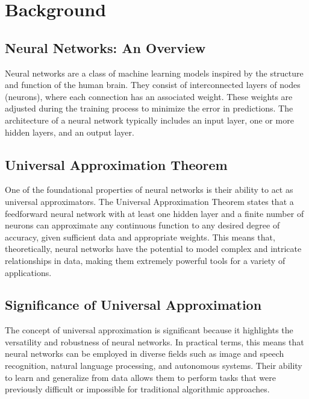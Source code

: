 \documentclass[11pt,a4paper]{article}
\begin{document}

\pagebreak

\section{Background}

\subsection{Neural Networks: An Overview}

Neural networks are a class of machine learning models inspired by the structure and function of the human brain. They consist of interconnected layers of nodes (neurons), where each connection has an associated weight. These weights are adjusted during the training process to minimize the error in predictions. The architecture of a neural network typically includes an input layer, one or more hidden layers, and an output layer.

\subsection{Universal Approximation Theorem}

One of the foundational properties of neural networks is their ability to act as universal approximators. The Universal Approximation Theorem states that a feedforward neural network with at least one hidden layer and a finite number of neurons can approximate any continuous function to any desired degree of accuracy, given sufficient data and appropriate weights. This means that, theoretically, neural networks have the potential to model complex and intricate relationships in data, making them extremely powerful tools for a variety of applications.

\subsection{Significance of Universal Approximation}

The concept of universal approximation is significant because it highlights the versatility and robustness of neural networks. In practical terms, this means that neural networks can be employed in diverse fields such as image and speech recognition, natural language processing, and autonomous systems. Their ability to learn and generalize from data allows them to perform tasks that were previously difficult or impossible for traditional algorithmic approaches.
\end{document}
